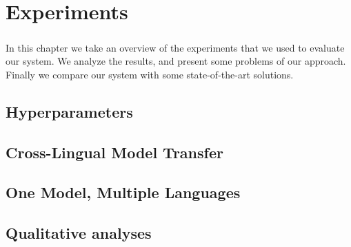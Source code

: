 
\chapter{Experiments}
\paragraph{}
In this chapter we take an overview of the experiments that we used to evaluate our system. We analyze the results, and present some problems of our approach. Finally we compare our system with some state-of-the-art solutions.


\section{Hyperparameters}


\section{Cross-Lingual Model Transfer}


\section{One Model, Multiple Languages}



\section{Qualitative analyses}